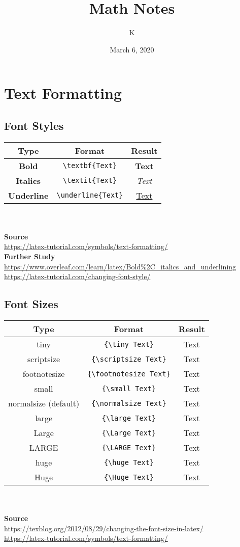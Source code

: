 \documentclass[10pt, letterpaper]{article}
\title{Math Notes}
\author{K}
\date{March 6, 2020}
\begin{document}
\maketitle
\tableofcontents{}
\pagebreak

\section{Text Formatting}
\subsection{Font Styles}
\begin{tabular}{c c c}
  Type & Format & Result\\
  \hline
  \textbf{Bold} & \verb|\textbf{Text}| & \textbf{Text}\\
  \textbf{Italics} & \verb|\textit{Text}| & \textit{Text}\\
  \textbf{Underline} & \verb|\underline{Text}| & \underline{Text}
\end{tabular}\\
\\
\textbf{Source}\\
\url{https://latex-tutorial.com/symbols/text-formatting/}\\
\textbf{Further Study}\\
\url{https://www.overleaf.com/learn/latex/Bold%2C_italics_and_underlining}\\
\url{https://latex-tutorial.com/changing-font-style/}

\subsection{Font Sizes}
\begin{tabular}{c c c}
    Type & Format & Result\\
    \hline
    tiny & \verb|{\tiny Text}| & {\tiny Text}\\
    scriptsize & \verb|{\scriptsize Text}| & {\scriptsize Text}\\
    footnotesize & \verb|{\footnotesize Text}| & {\footnotesize Text}\\
    small & \verb|{\small Text}| & {\small Text}\\
    normalsize (default) & \verb|{\normalsize Text}| & {\normalsize Text}\\
    large & \verb|{\large Text}| & {\large Text}\\
    Large & \verb|{\Large Text}| & {\Large Text}\\
    LARGE & \verb|{\LARGE Text}| & {\LARGE Text}\\
    huge & \verb|{\huge Text}| & {\huge Text}\\
    Huge & \verb|{\Huge Text}| & {\Huge Text}\\
\end{tabular}\\
\\
\textbf{Source}\\
\url{https://texblog.org/2012/08/29/changing-the-font-size-in-latex/}\\
\url{https://latex-tutorial.com/symbols/text-formatting/}
\end{document}
